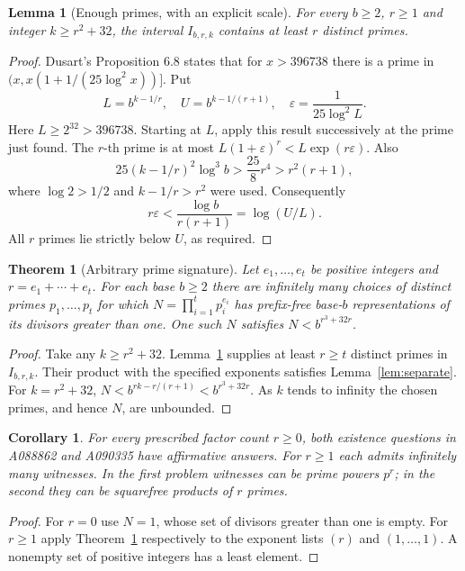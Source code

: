 \documentclass[10pt]{article}
\newtheorem{theorem}{Theorem}
\newtheorem{lemma}{Lemma}
\newtheorem{corollary}{Corollary}
\begin{document}
\newpage
\begin{lemma}[Enough primes, with an explicit scale]\label{lem:primes}
For every $b\ge2$, $r\ge1$ and integer $k\ge r^2+32$, the interval
$I_{b,r,k}$ contains at least $r$ distinct primes.
\end{lemma}
\begin{proof}
Dusart's Proposition 6.8 \cite{dusart} states that for $x>396738$ there
is a prime in $(x,x(1+1/(25\log^2x))]$. Put
\[
 L=b^{k-1/r},\quad U=b^{k-1/(r+1)},\quad
 \varepsilon=\frac1{25\log^2L}.
\]
Here $L\ge2^{32}>396738$. Starting at $L$, apply this result successively
at the prime just found. The $r$-th prime is at most
$L(1+\varepsilon)^r<L\exp(r\varepsilon)$. Also
\[
 25(k-1/r)^2\log^3b>\frac{25}{8}r^4>r^2(r+1),
\]
where $\log2>1/2$ and $k-1/r>r^2$ were used. Consequently
\[
 r\varepsilon<\frac{\log b}{r(r+1)}=\log(U/L).
\]
All $r$ primes lie strictly below $U$, as required.
\end{proof}

\begin{theorem}[Arbitrary prime signature]\label{thm:main}
Let $e_1,\ldots,e_t$ be positive integers and $r=e_1+\cdots+e_t$.
For each base $b\ge2$ there are infinitely many choices of distinct primes
$p_1,\ldots,p_t$ for which $N=\prod_{i=1}^t p_i^{e_i}$ has prefix-free
base-$b$ representations of its divisors greater than one. One such $N$
satisfies $N<b^{r^3+32r}$.
\end{theorem}
\begin{proof}
Take any $k\ge r^2+32$. Lemma~\ref{lem:primes} supplies at least $r\ge t$
distinct primes in $I_{b,r,k}$. Their product with the specified exponents
satisfies Lemma~\ref{lem:separate}. For $k=r^2+32$,
$N<b^{rk-r/(r+1)}<b^{r^3+32r}$. As $k$ tends to infinity the chosen primes,
and hence $N$, are unbounded.
\end{proof}

\begin{corollary}
For every prescribed factor count $r\ge0$, both existence questions in
A088862 and A090335 have affirmative answers. For $r\ge1$ each admits
infinitely many witnesses. In the first problem witnesses can be prime
powers $p^r$; in the second they can be squarefree products of $r$ primes.
\end{corollary}
\begin{proof}
For $r=0$ use $N=1$, whose set of divisors greater than one is empty.
For $r\ge1$ apply Theorem~\ref{thm:main} respectively to the exponent lists
$(r)$ and $(1,\ldots,1)$. A nonempty set of positive integers has a least
element.
\end{proof}
\end{document}
